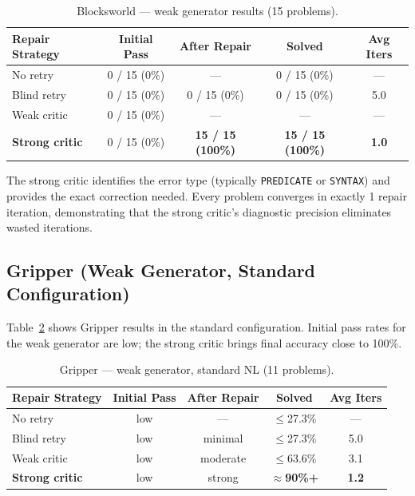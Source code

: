\documentclass{article}
\begin{document}
\begin{table}[h]
\centering
\caption{Blocksworld --- weak generator results (15 problems).}
\label{tab:bw_weak}
\begin{tabular}{lcccc}
\toprule
\textbf{Repair Strategy} & \textbf{Initial Pass} & \textbf{After Repair} & \textbf{Solved} & \textbf{Avg Iters} \\
\midrule
No retry          & 0 / 15 (0\%)  & ---           & 0 / 15 (0\%)    & ---  \\
Blind retry       & 0 / 15 (0\%)  & 0 / 15 (0\%)  & 0 / 15 (0\%)    & 5.0  \\
Weak critic       & 0 / 15 (0\%)  & ---           & ---             & ---  \\
\textbf{Strong critic} & 0 / 15 (0\%) & \textbf{15 / 15 (100\%)} & \textbf{15 / 15 (100\%)} & \textbf{1.0} \\
\bottomrule
\end{tabular}
\end{table}

The strong critic identifies the error type (typically \texttt{PREDICATE} or
\texttt{SYNTAX}) and provides the exact correction needed.  Every problem converges
in exactly 1 repair iteration, demonstrating that the strong critic's diagnostic
precision eliminates wasted iterations.

\subsection{Gripper (Weak Generator, Standard Configuration)}
\label{sec:gr_weak_std}

Table~\ref{tab:gr_weak_std} shows Gripper results in the standard configuration.
Initial pass rates for the weak generator are low; the strong critic brings final
accuracy close to 100\%.

\begin{table}[h]
\centering
\caption{Gripper --- weak generator, standard NL (11 problems).}
\label{tab:gr_weak_std}
\begin{tabular}{lcccc}
\toprule
\textbf{Repair Strategy} & \textbf{Initial Pass} & \textbf{After Repair} & \textbf{Solved} & \textbf{Avg Iters} \\
\midrule
No retry          & low       & ---       & $\leq$27.3\%   & ---  \\
Blind retry       & low       & minimal   & $\leq$27.3\%   & 5.0  \\
Weak critic       & low       & moderate  & $\leq$63.6\%   & 3.1  \\
\textbf{Strong critic} & low  & strong    & $\approx$\textbf{90\%+} & \textbf{1.2} \\
\bottomrule
\end{tabular}
\end{table}
\end{document}

